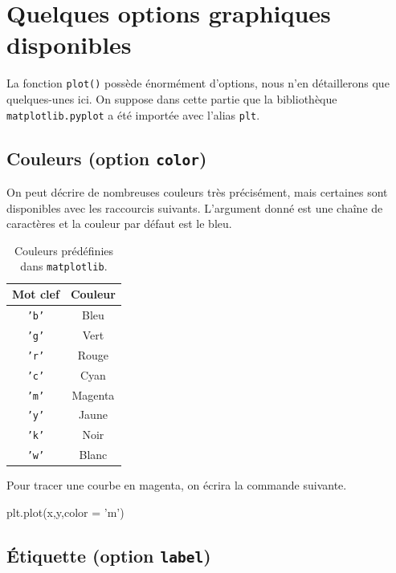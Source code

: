 \section{Quelques options graphiques disponibles}

La fonction \texttt{plot()} possède énormément d'options, nous n'en détaillerons que quelques-unes ici. On suppose dans 
cette partie que la bibliothèque \texttt{matplotlib.pyplot} a été importée avec l'alias \texttt{plt}.

\subsection{Couleurs (option \texttt{color})}

On peut décrire de nombreuses couleurs très précisément, mais certaines sont disponibles avec les raccourcis suivants. 
L'argument donné est une chaîne de caractères et la couleur par défaut est le bleu. 

\begin{table}[!h]
  \begin{center}
    \begin{tabular}{|c|c|}
      \hline
      Mot clef & Couleur \\
      \hline 
      \texttt{'b'} & Bleu \\
      \hline 
      \texttt{'g'} & Vert \\
      \hline 
      \texttt{'r'} & Rouge \\
      \hline 
      \texttt{'c'} & Cyan \\
      \hline 
      \texttt{'m'} & Magenta \\
      \hline 
      \texttt{'y'} & Jaune \\
      \hline 
      \texttt{'k'} & Noir \\
      \hline 
      \texttt{'w'} & Blanc \\
      \hline
    \end{tabular}
    \caption{Couleurs prédéfinies dans \texttt{matplotlib}.}
  \end{center}
\end{table}
\begin{exemple}
  Pour tracer une courbe en magenta, on écrira la commande suivante.
\begin{pyverbatim}
plt.plot(x,y,color = 'm')
\end{pyverbatim}
\end{exemple}

\subsection{Étiquette (option \texttt{label})}


